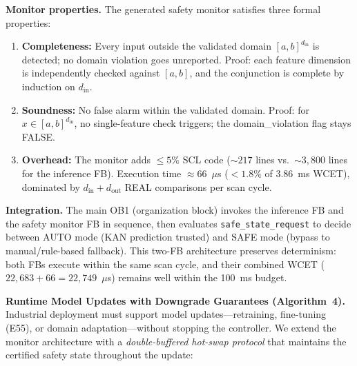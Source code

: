 \documentclass[journal,onecolumn]{IEEEtran}
\begin{document}
\vspace{4pt}
\noindent\textbf{Monitor properties.}
The generated safety monitor satisfies three formal properties:
\begin{enumerate}[label=(\roman*)]
    \item \textbf{Completeness:} Every input outside the validated domain
    $[a,b]^{d_{\text{in}}}$ is detected; no domain violation goes
   unreported. Proof: each feature dimension is independently checked
   against $[a,b]$, and the conjunction is complete by induction on
    $d_{\text{in}}$.
    \item \textbf{Soundness:} No false alarm within the validated domain.
   Proof: for $x \in [a,b]^{d_{\text{in}}}$, no single-feature check
   triggers; the domain\_violation flag stays FALSE.
    \item \textbf{Overhead:} The monitor adds $\leq 5\%$ SCL code
    ($\sim 217$ lines vs.~$\sim 3{,}800$ lines for the inference FB).
   Execution time $\approx 66$~$\mu$s ($< 1.8\%$ of 3.86~ms WCET),
   dominated by $d_{\text{in}} + d_{\text{out}}$ REAL comparisons per
   scan cycle.
\end{enumerate}

\vspace{4pt}
\noindent\textbf{Integration.}
The main OB1 (organization block) invokes the inference FB and the safety
monitor FB in sequence, then evaluates \texttt{safe\_state\_request} to
decide between AUTO mode (KAN prediction trusted) and SAFE mode (bypass
to manual/rule-based fallback). This two-FB architecture preserves
determinism: both FBs execute within the same scan cycle, and their
combined WCET ($22{,}683 + 66 = 22{,}749$~$\mu$s) remains well within
the 100~ms budget.

\vspace{4pt}
\noindent\textbf{Runtime Model Updates with Downgrade Guarantees (Algorithm~4).}
Industrial deployment must support model updates---retraining, fine-tuning
(E55), or domain adaptation---without stopping the controller. We extend
the monitor architecture with a \emph{double-buffered hot-swap protocol}
that maintains the certified safety state throughout the update:
\end{document}
